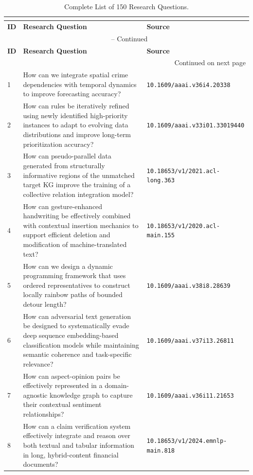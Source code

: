 \documentclass[runningheads]{llncs}
\begin{document}
\footnotesize
\begin{longtable}{@{}p{0.5cm}p{7.2cm}p{2.5cm}@{}}
\caption{Complete List of 150 Research Questions.} \\
\label{tab:rq_complete_list} \\
\toprule
\textbf{ID} & \textbf{Research Question} & \textbf{Source} \\
\midrule
\endfirsthead
\multicolumn{3}{c}{\tablename\ \thetable{} -- Continued} \\
\toprule
\textbf{ID} & \textbf{Research Question} & \textbf{Source} \\
\midrule
\endhead
\midrule
\multicolumn{3}{r}{Continued on next page} \\
\endfoot
\bottomrule
\endlastfoot

1 & How can we integrate spatial crime dependencies with temporal dynamics to improve forecasting accuracy? & \texttt{10.1609/aaai.v36i4.20338} \\
2 & How can rules be iteratively refined using newly identified high-priority instances to adapt to evolving data distributions and improve long-term prioritization accuracy? & \texttt{10.1609/aaai.v33i01.33019440} \\
3 & How can pseudo-parallel data generated from structurally informative regions of the unmatched target KG improve the training of a collective relation integration model? & \texttt{10.18653/v1/2021.acl-long.363} \\
4 & How can gesture-enhanced handwriting be effectively combined with contextual insertion mechanics to support efficient deletion and modification of machine-translated text? & \texttt{10.18653/v1/2020.acl-main.155} \\
5 & How can we design a dynamic programming framework that uses ordered representatives to construct locally rainbow paths of bounded detour length? & \texttt{10.1609/aaai.v38i8.28639} \\
6 & How can adversarial text generation be designed to systematically evade deep sequence embedding-based classification models while maintaining semantic coherence and task-specific relevance? & \texttt{10.1609/aaai.v37i13.26811} \\
7 & How can aspect-opinion pairs be effectively represented in a domain-agnostic knowledge graph to capture their contextual sentiment relationships? & \texttt{10.1609/aaai.v36i11.21653} \\
8 & How can a claim verification system effectively integrate and reason over both textual and tabular information in long, hybrid-content financial documents? & \texttt{10.18653/v1/2024.emnlp-main.818} \\

\end{longtable}
\end{document}
